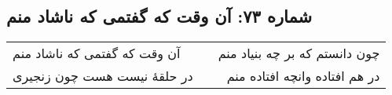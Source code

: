 \begin{center}
\section*{شماره ۷۳: آن وقت که گفتمی که ناشاد منم}
\label{sec:073}
\begin{longtable}{l p{0.5cm} r}
آن وقت که گفتمی که ناشاد منم
&&
چون دانستم که بر چه بنیاد منم
\\
در حلقهٔ نیست هست چون زنجیری
&&
در هم افتاده وانچه افتاده منم
\\
\end{longtable}
\end{center}

